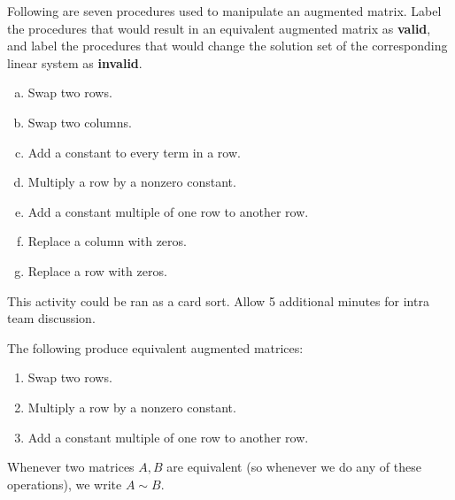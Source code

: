 \begin{applicationActivities}
\begin{activity}{10}
  Following are seven procedures used to manipulate an augmented matrix.
  Label the procedures that would result in an equivalent augmented
  matrix as \textbf{valid}, and label the procedures that would
  change the solution set of the corresponding linear system as
  \textbf{invalid}.
  \begin{multicols}{2}
    \begin{enumerate}[a)]
      \item Swap two rows.
      \item Swap two columns.
      \item Add a constant to every term in a row.
      \item Multiply a row by a nonzero constant.
      \item Add a constant multiple of one row to another row.
      \item Replace a column with zeros.
      \item Replace a row with zeros.
    \end{enumerate}
  \end{multicols}
  \begin{instructorNote}
    This activity could be ran as a card sort.  Allow 5 additional minutes for intra team discussion.
  \end{instructorNote}
\end{activity}


\begin{definition}
  The following  produce equivalent
  augmented matrices:
  \begin{enumerate}
    \item Swap two rows.
    \item Multiply a row by a nonzero constant.
    \item Add a constant multiple of one row to another row.
  \end{enumerate}
  Whenever two matrices \(A,B\) are equivalent (so whenever we do any of
  these operations), we write \(A\sim B\).
\end{definition}


\end{applicationActivities}

